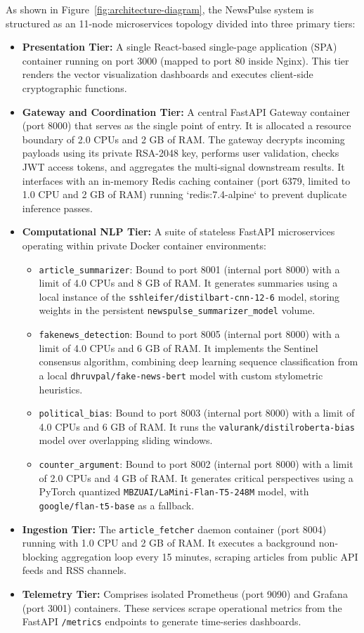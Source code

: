 As shown in Figure~\ref{fig:architecture-diagram}, the NewsPulse system is structured as an 11-node microservices topology divided into three primary tiers:
\begin{itemize}
    \item \textbf{Presentation Tier:} A single React-based single-page application (SPA) container running on port 3000 (mapped to port 80 inside Nginx). This tier renders the vector visualization dashboards and executes client-side cryptographic functions.
    \item \textbf{Gateway and Coordination Tier:} A central FastAPI Gateway container (port 8000) that serves as the single point of entry. It is allocated a resource boundary of 2.0 CPUs and 2 GB of RAM. The gateway decrypts incoming payloads using its private RSA-2048 key, performs user validation, checks JWT access tokens, and aggregates the multi-signal downstream results. It interfaces with an in-memory Redis caching container (port 6379, limited to 1.0 CPU and 2 GB of RAM) running `redis:7.4-alpine` to prevent duplicate inference passes.
    \item \textbf{Computational NLP Tier:} A suite of stateless FastAPI microservices operating within private Docker container environments:
    \begin{itemize}
        \item \texttt{article\_summarizer}: Bound to port 8001 (internal port 8000) with a limit of 4.0 CPUs and 8 GB of RAM. It generates summaries using a local instance of the \texttt{sshleifer/distilbart-cnn-12-6} model, storing weights in the persistent \texttt{newspulse\_summarizer\_model} volume.
        \item \texttt{fakenews\_detection}: Bound to port 8005 (internal port 8000) with a limit of 4.0 CPUs and 6 GB of RAM. It implements the Sentinel consensus algorithm, combining deep learning sequence classification from a local \texttt{dhruvpal/fake-news-bert} model with custom stylometric heuristics.
        \item \texttt{political\_bias}: Bound to port 8003 (internal port 8000) with a limit of 4.0 CPUs and 6 GB of RAM. It runs the \texttt{valurank/distilroberta-bias} model over overlapping sliding windows.
        \item \texttt{counter\_argument}: Bound to port 8002 (internal port 8000) with a limit of 2.0 CPUs and 4 GB of RAM. It generates critical perspectives using a PyTorch quantized \texttt{MBZUAI/LaMini-Flan-T5-248M} model, with \texttt{google/flan-t5-base} as a fallback.
    \end{itemize}
    \item \textbf{Ingestion Tier:} The \texttt{article\_fetcher} daemon container (port 8004) running with 1.0 CPU and 2 GB of RAM. It executes a background non-blocking aggregation loop every 15 minutes, scraping articles from public API feeds and RSS channels.
    \item \textbf{Telemetry Tier:} Comprises isolated Prometheus (port 9090) and Grafana (port 3001) containers. These services scrape operational metrics from the FastAPI \texttt{/metrics} endpoints to generate time-series dashboards.
\end{itemize}

